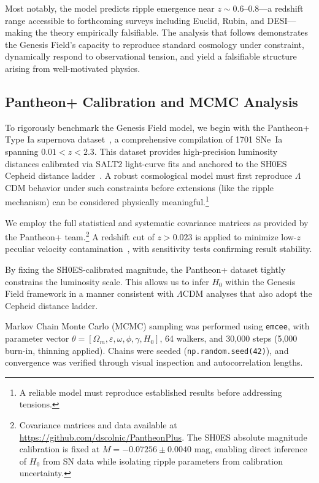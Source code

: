 Most notably, the model predicts ripple emergence near $z \sim 0.6$–$0.8$—a redshift range accessible to forthcoming surveys including Euclid, Rubin, and DESI—making the theory empirically falsifiable. The analysis that follows demonstrates the Genesis Field's capacity to reproduce standard cosmology under constraint, dynamically respond to observational tension, and yield a falsifiable structure arising from well-motivated physics.

\subsection{Pantheon+ Calibration and MCMC Analysis}
\label{sec:pantheon}

To rigorously benchmark the Genesis Field model, we begin with the Pantheon+ Type Ia supernova dataset~\cite{Brout2022}, a comprehensive compilation of 1701 SNe~Ia spanning $0.01 < z < 2.3$. This dataset provides high-precision luminosity distances calibrated via SALT2 light-curve fits and anchored to the SH0ES Cepheid distance ladder~\cite{Riess2022}. A robust cosmological model must first reproduce $\Lambda$CDM behavior under such constraints before extensions (like the ripple mechanism) can be considered physically meaningful.\footnote{A reliable model must reproduce established results before addressing tensions.}

We employ the full statistical and systematic covariance matrices as provided by the Pantheon+ team.\footnote{Covariance matrices and data available at \url{https://github.com/dscolnic/PantheonPlus}. The SH0ES absolute magnitude calibration is fixed at $M = -0.07256 \pm 0.0040$ mag, enabling direct inference of $H_0$ from SN data while isolating ripple parameters from calibration uncertainty.} A redshift cut of $z > 0.023$ is applied to minimize low-$z$ peculiar velocity contamination~\cite{Scolnic2018}, with sensitivity tests confirming result stability.

By fixing the SH0ES-calibrated magnitude, the Pantheon+ dataset tightly constrains the luminosity scale. This allows us to infer $H_0$ within the Genesis Field framework in a manner consistent with $\Lambda$CDM analyses that also adopt the Cepheid distance ladder.

Markov Chain Monte Carlo (MCMC) sampling was performed using \texttt{emcee}, with parameter vector $\theta = [\Omega_m, \varepsilon, \omega, \phi, \gamma, H_0]$, 64 walkers, and 30{,}000 steps (5{,}000 burn-in, thinning applied). Chains were seeded (\texttt{np.random.seed(42)}), and convergence was verified through visual inspection and autocorrelation lengths.

